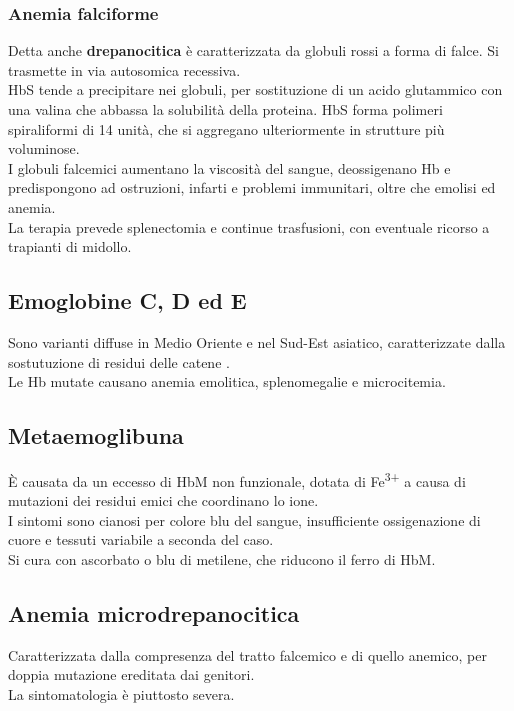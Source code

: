 \documentclass[a4paper, 12pt]{article}
\begin{document}
\subsubsection{Anemia falciforme}
Detta anche \textbf{drepanocitica} è caratterizzata da globuli rossi a forma di falce. Si trasmette in via autosomica recessiva.\\
HbS tende a precipitare nei globuli, per sostituzione di un acido glutammico con una valina che abbassa la solubilità della proteina. HbS forma polimeri spiraliformi di 14 unità, che si aggregano ulteriormente in strutture più voluminose.
\\ I globuli falcemici aumentano la viscosità del sangue, deossigenano Hb e predispongono ad ostruzioni, infarti e problemi immunitari, oltre che emolisi ed anemia.\\
La terapia prevede splenectomia e continue trasfusioni, con eventuale ricorso a trapianti di midollo.

\subsection{Emoglobine C, D ed E}
Sono varianti diffuse in Medio Oriente e nel Sud-Est asiatico, caratterizzate dalla sostutuzione di residui delle catene {\textbeta}.\\
Le Hb mutate causano anemia emolitica, splenomegalie e microcitemia.

\subsection{Metaemoglibuna}
È causata da un eccesso di HbM non funzionale, dotata di Fe\textsuperscript{3+} a causa di mutazioni dei residui emici che coordinano lo ione.\\
I sintomi sono cianosi per colore blu del sangue, insufficiente ossigenazione di cuore e tessuti variabile a seconda del caso.\\
Si cura con ascorbato o blu di metilene, che riducono il ferro di HbM.

\subsection{Anemia microdrepanocitica}
Caratterizzata dalla compresenza del tratto falcemico e di quello anemico, per doppia mutazione ereditata dai genitori.\\ La sintomatologia è piuttosto severa.
\end{document}
